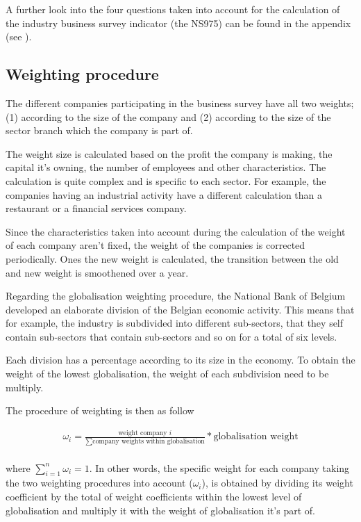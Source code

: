 \documentclass[12pt,a4paper,oneside]{book}
\begin{document}
A further look into the four questions taken into account for the calculation of the industry business survey indicator (the NS975) can be found in the appendix (see ).




\subsection{Weighting procedure}
\label{sec:Weighting procedure}

The different companies participating in the business survey have all two weights; (1) according to the size of the company and (2) according to the size of the sector branch which the company is part of.

The weight size is calculated based on the profit the company is making, the capital it's owning, the number of employees and other characteristics. 
The calculation is quite complex and is specific to each sector. 
For example, the companies having an industrial activity have a different calculation than a restaurant or a financial services company.

Since the characteristics taken into account during the calculation of the weight of each company aren't fixed, the weight of the companies is corrected periodically. 
Ones the new weight is calculated, the transition between the old and new weight is smoothened over a year.

Regarding the globalisation weighting procedure, the National Bank of Belgium developed an elaborate division of the Belgian economic activity. This means that for example, the industry is subdivided into different sub-sectors, that they self contain sub-sectors that contain sub-sectors and so on for a total of six levels. 

Each division has a percentage according to its size in the economy.
To obtain the weight of the lowest globalisation, the weight of each subdivision need to be multiply. 

The procedure of weighting is then as follow

\begin{eqnarray}
    \omega_i = \frac{ \text{weight company $i$} }{ \sum\text{company weights within globalisation} } * \text{globalisation weight} \\ \nonumber
\end{eqnarray}

where $\sum_{i=1}^{n} \omega_i = 1 $. In other words, the specific weight for each company taking the two weighting procedures into account ($\omega_i$), is obtained by dividing its weight coefficient by the total of weight coefficients within the lowest level of globalisation and multiply it with the weight of globalisation it's part of. 
\end{document}
